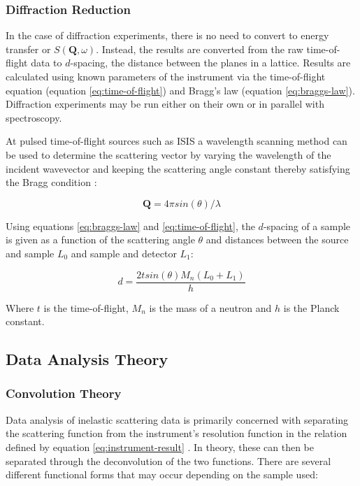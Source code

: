 \documentclass[paper=a4, fontsize=11pt]{scrartcl}	%
\numberwithin{equation}{section}															%
\numberwithin{figure}{section}																%
\numberwithin{table}{section}																%
\begin{document}
\subsubsection{Diffraction Reduction}
In the case of diffraction experiments, there is no need to convert to energy transfer or $S(\mathbf{Q}, \omega)$. Instead, the results are converted from the raw time-of-flight data to $d$-spacing, the distance between the planes in a lattice. Results are calculated using known parameters of the instrument via the time-of-flight equation (equation \ref{eq:time-of-flight}) and Bragg's law (equation \ref{eq:braggs-law}). Diffraction experiments may be run either on their own or in parallel with spectroscopy.

At pulsed time-of-flight sources such as ISIS a wavelength scanning method can be used to determine the scattering vector by varying the wavelength of the incident wavevector and keeping the scattering angle constant thereby satisfying the Bragg condition \citep{fernandezalonso2013neutron}:

\begin{equation}
\label{eq:bragg-condition}
\textbf{Q} = 4\pi sin(\theta)/\lambda
\end{equation}

Using equations \ref{eq:braggs-law} and \ref{eq:time-of-flight}, the $d$-spacing of a sample is given as a function of the scattering angle $\theta$ and distances between the source and sample $L_0$ and sample and detector $L_1$:

\begin{equation}
d = \frac{2 t sin(\theta)M_n (L_0 + L_1)}{h}
\end{equation}

Where $t$ is the time-of-flight, $M_n$ is the mass of a neutron and $h$ is the Planck constant.
 
\subsection{Data Analysis Theory}

\subsubsection{Convolution Theory}
Data analysis of inelastic scattering data is primarily concerned with separating the scattering function from the instrument's resolution function in the relation defined by equation \ref{eq:instrument-result} . In theory, these can then be separated through the deconvolution of the two functions. There are several different functional forms that may occur depending on the sample used:
\end{document}
